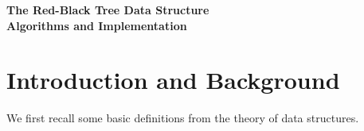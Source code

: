 \documentclass[10pt]{article}
\begin{document}
\begin{center}
  \textbf{The Red-Black Tree Data Structure} \\
  \textbf{Algorithms and Implementation}
\end{center}

\section{Introduction and Background}

We first recall some basic definitions from the theory of data structures.
\end{document}
